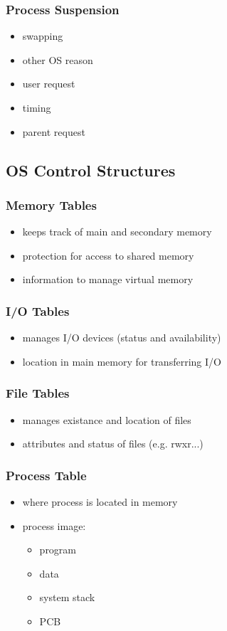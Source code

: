 \documentclass[]{article}
\theoremstyle{definition}
\begin{document}
			\subsubsection{Process Suspension}
				\begin{itemize}
					\item swapping
					\item other OS reason
					\item user request
					\item timing
					\item parent request
				\end{itemize}

		\subsection{OS Control Structures}
			\subsubsection{Memory Tables}
				\begin{itemize}
					\item keeps track of main and secondary memory
					\item protection for access to shared memory
					\item information to manage virtual memory
				\end{itemize}
			\subsubsection{I/O Tables}
				\begin{itemize}
					\item manages I/O devices (status and availability)
					\item location in main memory for transferring I/O
				\end{itemize}
			\subsubsection{File Tables}
				\begin{itemize}
					\item manages existance and location of files
					\item attributes and status of files (e.g. rwxr...)
				\end{itemize}
			\subsubsection{Process Table}
				\begin{itemize}
					\item where process is located in memory
					\item process image:
					\begin{itemize}
						\item program
						\item data
						\item system stack
						\item PCB
					\end{itemize}
				\end{itemize}
\end{document}
